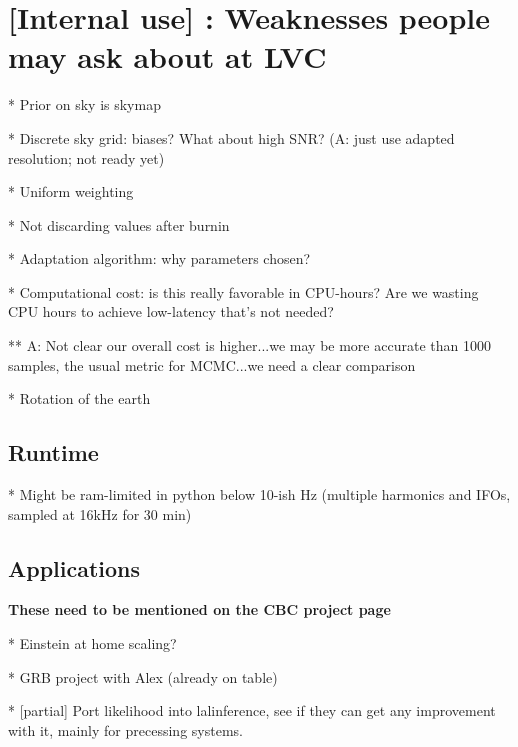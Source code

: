 \section{[Internal use] : Weaknesses people may ask about at LVC}

* Prior on sky is skymap

* Discrete sky grid: biases? What about high SNR? (A: just use adapted resolution; not ready yet)

* Uniform weighting

* Not discarding values after burnin

* Adaptation algorithm: why parameters chosen?

* Computational cost: is this really favorable in CPU-hours?  Are we wasting CPU hours to achieve low-latency that's not needed?

** A: Not clear our overall cost is higher...we may be more accurate than 1000 samples, the usual metric for MCMC...we need a clear comparison

* Rotation of the earth

\subsection{Runtime}

* Might be ram-limited in python below 10-ish Hz (multiple harmonics and IFOs, sampled at 16kHz for 30 min)

\subsection{Applications}

\textbf{These need to be mentioned on the CBC project page}

* Einstein at home scaling?

* GRB project with Alex (already on table)

* [partial] Port likelihood into lalinference, see if they can get any improvement with it, mainly for precessing systems.

